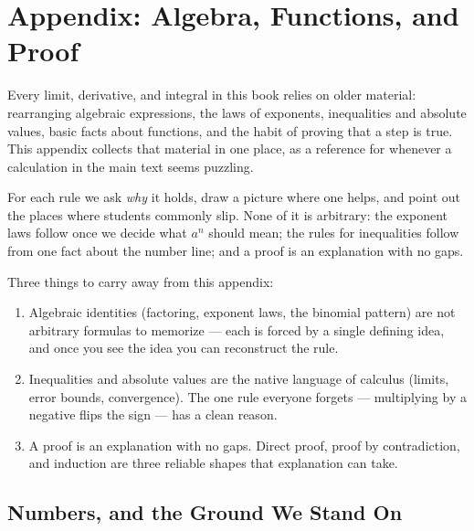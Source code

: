 \chapter{Appendix: Algebra, Functions, and Proof}

Every limit, derivative, and integral in this book relies on older material:
rearranging algebraic expressions, the laws of exponents, inequalities and
absolute values, basic facts about functions, and the habit of proving that a
step is true. This appendix collects that material in one place, as a reference
for whenever a calculation in the main text seems puzzling.

For each rule we ask \emph{why} it holds, draw a picture where one helps, and
point out the places where students commonly slip. None of it is arbitrary: the
exponent laws follow once we decide what $a^n$ should mean; the rules for
inequalities follow from one fact about the number line; and a proof is an
explanation with no gaps.

\begin{focusbox}
Three things to carry away from this appendix:
\begin{enumerate}
  \item Algebraic identities (factoring, exponent laws, the binomial pattern)
        are not arbitrary formulas to memorize --- each is forced by a single
        defining idea, and once you see the idea you can reconstruct the rule.
  \item Inequalities and absolute values are the native language of calculus
        (limits, error bounds, convergence). The one rule everyone forgets ---
        multiplying by a negative flips the sign --- has a clean reason.
  \item A proof is an explanation with no gaps. Direct proof, proof by
        contradiction, and induction are three reliable shapes that explanation
        can take.
\end{enumerate}
\end{focusbox}

\section{Numbers, and the Ground We Stand On}
\label{ch40:numbers}

